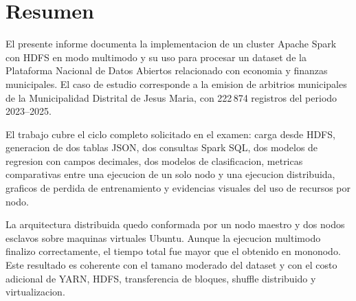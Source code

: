 \section{Resumen}

El presente informe documenta la implementacion de un cluster Apache Spark con HDFS en modo multimodo y su uso para procesar un dataset de la Plataforma Nacional de Datos Abiertos relacionado con economia y finanzas municipales. El caso de estudio corresponde a la emision de arbitrios municipales de la Municipalidad Distrital de Jesus Maria, con 222\,874 registros del periodo 2023--2025.

El trabajo cubre el ciclo completo solicitado en el examen: carga desde HDFS, generacion de dos tablas JSON, dos consultas Spark SQL, dos modelos de regresion con campos decimales, dos modelos de clasificacion, metricas comparativas entre una ejecucion de un solo nodo y una ejecucion distribuida, graficos de perdida de entrenamiento y evidencias visuales del uso de recursos por nodo.

La arquitectura distribuida quedo conformada por un nodo maestro y dos nodos esclavos sobre maquinas virtuales Ubuntu. Aunque la ejecucion multimodo finalizo correctamente, el tiempo total fue mayor que el obtenido en mononodo. Este resultado es coherente con el tamano moderado del dataset y con el costo adicional de YARN, HDFS, transferencia de bloques, shuffle distribuido y virtualizacion.
